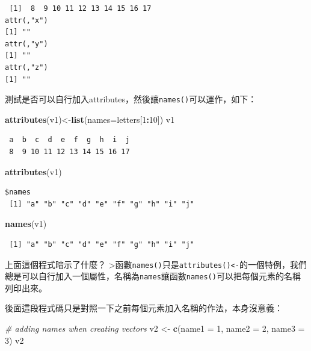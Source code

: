 \documentclass[]{book}
\newenvironment{Shaded}{\begin{snugshade}}{\end{snugshade}}
\newcommand{\CommentTok}[1]{\textcolor[rgb]{0.56,0.35,0.01}{\textit{#1}}}
\newcommand{\DataTypeTok}[1]{\textcolor[rgb]{0.13,0.29,0.53}{#1}}
\newcommand{\DecValTok}[1]{\textcolor[rgb]{0.00,0.00,0.81}{#1}}
\newcommand{\KeywordTok}[1]{\textcolor[rgb]{0.13,0.29,0.53}{\textbf{#1}}}
\newcommand{\NormalTok}[1]{#1}
\newcommand{\OperatorTok}[1]{\textcolor[rgb]{0.81,0.36,0.00}{\textbf{#1}}}
\newcommand{\StringTok}[1]{\textcolor[rgb]{0.31,0.60,0.02}{#1}}
\theoremstyle{definition}
\theoremstyle{definition}
\theoremstyle{definition}
\theoremstyle{remark}
\begin{document}
\begin{verbatim}
 [1]  8  9 10 11 12 13 14 15 16 17
attr(,"x")
[1] ""
attr(,"y")
[1] ""
attr(,"z")
[1] ""
\end{verbatim}

測試是否可以自行加入attributes，然後讓\texttt{names()}可以運作，如下：

\begin{Shaded}
\begin{Highlighting}[]
\KeywordTok{attributes}\NormalTok{(v1)<-}\KeywordTok{list}\NormalTok{(}\DataTypeTok{names=}\NormalTok{letters[}\DecValTok{1}\OperatorTok{:}\DecValTok{10}\NormalTok{])}
\NormalTok{v1}
\end{Highlighting}
\end{Shaded}

\begin{verbatim}
 a  b  c  d  e  f  g  h  i  j 
 8  9 10 11 12 13 14 15 16 17 
\end{verbatim}

\begin{Shaded}
\begin{Highlighting}[]
\KeywordTok{attributes}\NormalTok{(v1)}
\end{Highlighting}
\end{Shaded}

\begin{verbatim}
$names
 [1] "a" "b" "c" "d" "e" "f" "g" "h" "i" "j"
\end{verbatim}

\begin{Shaded}
\begin{Highlighting}[]
\KeywordTok{names}\NormalTok{(v1)}
\end{Highlighting}
\end{Shaded}

\begin{verbatim}
 [1] "a" "b" "c" "d" "e" "f" "g" "h" "i" "j"
\end{verbatim}

上面這個程式暗示了什麼？
\textgreater{}函數\texttt{names()}只是\texttt{attributes()\textless{}-}的一個特例，我們總是可以自行加入一個屬性，名稱為\texttt{names}讓函數\texttt{names()}可以把每個元素的名稱列印出來。

後面這段程式碼只是對照一下之前每個元素加入名稱的作法，本身沒意義：

\begin{Shaded}
\begin{Highlighting}[]
\CommentTok{# adding names when creating vectors}
\NormalTok{v2 <-}\StringTok{ }\KeywordTok{c}\NormalTok{(}\DataTypeTok{name1 =} \DecValTok{1}\NormalTok{, }\DataTypeTok{name2 =} \DecValTok{2}\NormalTok{, }\DataTypeTok{name3 =} \DecValTok{3}\NormalTok{)}
\NormalTok{v2}
\end{Highlighting}
\end{Shaded}
\end{document}
